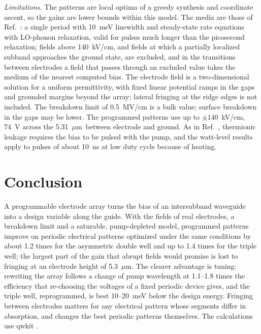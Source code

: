 \documentclass[11pt]{article}
\newcommand{\um}{~$\mu$m}
\begin{document}
\emph{Limitations.} The patterns are local optima of a greedy synthesis and coordinate ascent, so the gains are lower bounds within this model. The media are those of Ref.~\cite{OwnbyN1}: a single period with 10~meV linewidth and steady-state rate equations with LO-phonon relaxation, valid for pulses much longer than the picosecond relaxation; fields above 140~kV/cm, and fields at which a partially localized subband approaches the ground state, are excluded, and in the transitions between electrodes a field that passes through an excluded value takes the medium of the nearest computed bias. The electrode field is a two-dimensional solution for a uniform permittivity, with fixed linear potential ramps in the gaps and grounded margins beyond the array; lateral fringing at the ridge edges is not included. The breakdown limit of 0.5~MV/cm is a bulk value; surface breakdown in the gaps may be lower. The programmed patterns use up to $\pm140$~kV/cm, 74~V across the 5.31\um\ between electrode and ground. As in Ref.~\cite{OwnbyN1}, thermionic leakage requires the bias to be pulsed with the pump, and the watt-level results apply to pulses of about 10~ns at low duty cycle because of heating.

\section{Conclusion}
A programmable electrode array turns the bias of an intersubband waveguide into a design variable along the guide. With the fields of real electrodes, a breakdown limit and a saturable, pump-depleted model, programmed patterns improve on periodic electrical patterns optimized under the same conditions by about 1.2 times for the asymmetric double well and up to 1.4 times for the triple well; the largest part of the gain that abrupt fields would promise is lost to fringing at an electrode height of 5.3\um. The clearer advantage is tuning: rewriting the array follows a change of pump wavelength at 1.1--1.8 times the efficiency that re-choosing the voltages of a fixed periodic device gives, and the triple well, reprogrammed, is best 10--20~meV below the design energy. Fringing between electrodes matters for any electrical pattern whose segments differ in absorption, and changes the best periodic patterns themselves. The calculations use qwkit \cite{qwkit}.



\end{document}
